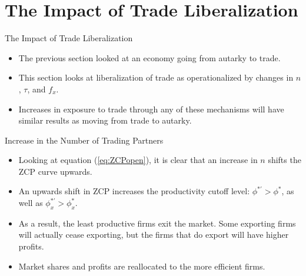 \documentclass[aspectratio=169]{beamer}
\begin{document}

\section{The Impact of Trade Liberalization}


\begin{frame}{The Impact of Trade Liberalization}

\begin{itemize}
    \item<1-> The previous section looked at an economy going from autarky to trade.
    \item<2-> This section looks at liberalization of trade as operationalized by changes in $ n $, $ \tau $, and $ f_{x} $.
    \item<3-> Increases in exposure to trade through any of these mechanisms will have similar results as moving from trade to autarky. 
\end{itemize}
    
\end{frame}


\begin{frame}{Increase in the Number of Trading Partners}

\begin{itemize}
    \item<1-> Looking at equation (\ref{eq:ZCPopen}), it is clear that an increase in $ n $ shifts the ZCP curve upwards.
    \item<2-> An upwards shift in ZCP increases the productivity cutoff level: $ \phi^{*'} > \phi^{*} $, as well as $ \phi_{x}^{*'} > \phi_{x}^{*} $.
    \item<3-> As a result, the least productive firms exit the market.  Some exporting firms will actually cease exporting, but the firms that do export will have higher profits.
    \item<4-> Market shares and profits are reallocated to the more efficient firms.
\end{itemize}
    
\end{frame}

\end{document}
